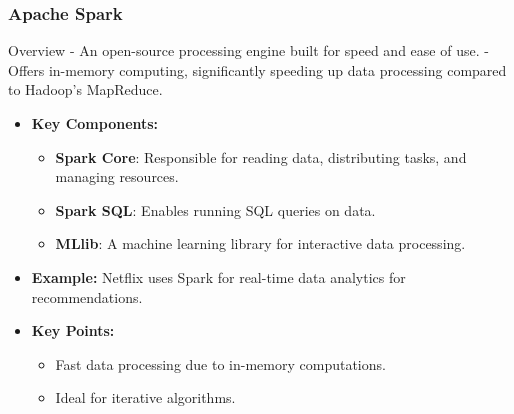 \documentclass{beamer}
\begin{document}
\begin{frame}[fragile]
    \frametitle{Apache Spark}
    \begin{block}{Overview}
        - An open-source processing engine built for speed and ease of use.
        - Offers in-memory computing, significantly speeding up data processing compared to Hadoop's MapReduce.
    \end{block}

    \begin{itemize}
        \item \textbf{Key Components:}
        \begin{itemize}
            \item \textbf{Spark Core}: Responsible for reading data, distributing tasks, and managing resources.
            \item \textbf{Spark SQL}: Enables running SQL queries on data.
            \item \textbf{MLlib}: A machine learning library for interactive data processing.
        \end{itemize}
        
        \item \textbf{Example:} Netflix uses Spark for real-time data analytics for recommendations.
        
        \item \textbf{Key Points:} 
        \begin{itemize}
            \item Fast data processing due to in-memory computations.
            \item Ideal for iterative algorithms.
        \end{itemize}
    \end{itemize}
\end{frame}
\end{document}

